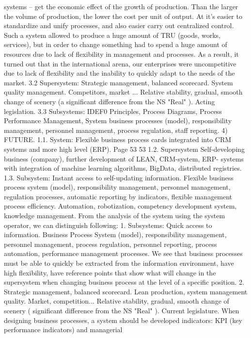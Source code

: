 systems -- get the economic effect of the growth of production. Than
the larger the volume of production, the lower the cost per unit of output. At
it’s easier to standardize and unify processes, and also easier
carry out centralized control. Such a system allowed to produce
a huge amount of TRU (goods, works, services), but in order to change something
had to spend a huge amount of resources due to lack of flexibility
in management and processes. As a result, it turned out that in the international arena, our
enterprises were uncompetitive due to lack of flexibility and
the inability to quickly adapt to the needs of the market.
3.2 Supersystem:
Strategic management, balanced scorecard. System
quality management. Competitors, market ... Relative stability, gradual,
smooth change of scenery (a significant difference from the NS "Real" ). Acting
legislation.
3.3 Subsystems:
IDEF0 Principles, Process Diagrams, Process Performance Management, System
business processes (model), responsibility management, personnel management,
process regulation, staff reporting.
4) FUTURE.
1.1. System:
Flexible business process cards integrated into CRM systems and more
high level (ERP).
Page 53
53
1.2. Supersystem
Self-developing business (company), further development of LEAN, CRM-system, ERP-
systems with integration of machine learning algorithms, BigData, distributed
registries.
1.3. Subsystem:
Instant access to self-updating information. Flexible business process system
(model), responsibility management, personnel management, regulation
processes, automatic reporting by indicators, flexible management
process efficiency. Automation, robotization, competency development system,
knowledge management.
From the analysis of the system using the system operator, we can distinguish
following:
1. Subsystems: Quick access to information. Business Process System (model),
responsibility management, personnel management, process regulation,
personnel reporting, process automation, performance management
processes. We see that business processes must be able to quickly
be extracted from the information environment, have high flexibility, have
reference points that show what will change in the supersystem when changing
business process at the level of a specific position.
2. Strategic management, balanced scorecard. Lean
production,
system
management
quality.
Market,
competition...
Relative stability, gradual, smooth change of scenery
( significant difference from the NS "Real" ). Current legislature.
When designing business processes, a system should be developed
indicators: KPI (key performance indicators) and managerial
